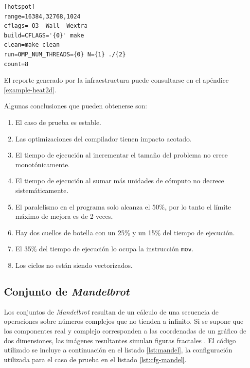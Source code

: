 \documentclass[a4paper]{report}
\begin{document}
\bigskip

\begin{lstlisting}[caption={Caso de Prueba de Distribución de Calor en 2 Dimensiones},label={lst:cfg-heat}]
[hotspot]
range=16384,32768,1024
cflags=-O3 -Wall -Wextra
build=CFLAGS='{0}' make
clean=make clean
run=OMP_NUM_THREADS={0} N={1} ./{2}
count=8
\end{lstlisting}

\bigskip

El reporte generado por la infraestructura puede consultarse en el apéndice \ref{example-heat2d}.

\bigskip

Algunas conclusiones que pueden obtenerse son:

\begin{enumerate}
\item El caso de prueba es estable.
\item Las optimizaciones del compilador tienen impacto acotado.
\item El tiempo de ejecución al incrementar el tamaño del problema no crece monotónicamente.
\item El tiempo de ejecución al sumar más unidades de cómputo no decrece sistemáticamente.
\item El paralelismo en el programa solo alcanza el 50\%, por lo tanto el límite máximo de mejora es de 2 veces.
\item Hay dos cuellos de botella con un 25\% y un 15\% del tiempo de ejecución.
\item El 35\% del tiempo de ejecución lo ocupa la instrucción {\tt mov}.
\item Los ciclos no están siendo vectorizados.
\end{enumerate}

\subsection{Conjunto de {\it Mandelbrot}}

Los conjuntos de {\it Mandelbrot} resultan de un cálculo de una secuencia de operaciones sobre números complejos que no tienden a infinito.
Si se supone que los componentes real y complejo corresponden a las coordenadas de un gráfico de dos dimensiones, las imágenes resultantes simulan figuras fractales \cite{mandel}.
El código utilizado se incluye a continuación en el listado \ref{lst:mandel}, la configuración utilizada para el caso de prueba en el listado \ref{lst:cfg-mandel}.
\end{document}
